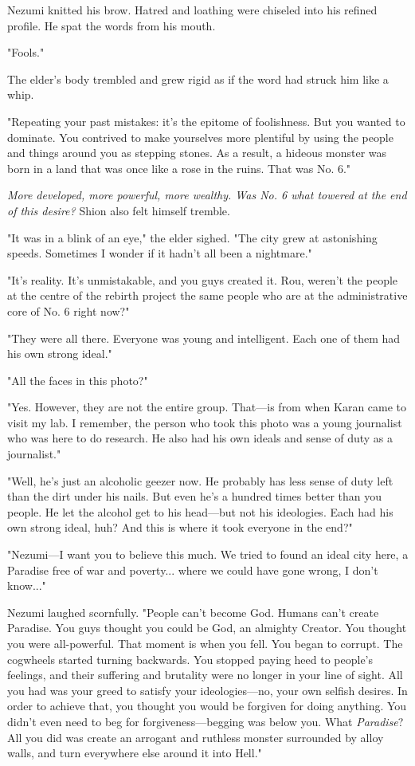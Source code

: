 Nezumi knitted his brow. Hatred and loathing were chiseled into his
refined profile. He spat the words from his mouth.

"Fools."

The elder's body trembled and grew rigid as if the word had struck him
like a whip.

"Repeating your past mistakes: it's the epitome of foolishness. But you
wanted to dominate. You contrived to make yourselves more plentiful by
using the people and things around you as stepping stones. As a result,
a hideous monster was born in a land that was once like a rose in the
ruins. That was No. 6."

\emph{More developed, more powerful, more wealthy. Was No. 6 what towered at
the end of this desire?} Shion also felt himself tremble.

"It was in a blink of an eye," the elder sighed. "The city grew at
astonishing speeds. Sometimes I wonder if it hadn't all been a
nightmare."

"It's reality. It's unmistakable, and you guys created it. Rou, weren't
the people at the centre of the rebirth project the same people who are
at the administrative core of No. 6 right now?"

"They were all there. Everyone was young and intelligent. Each one of
them had his own strong ideal."

"All the faces in this photo?"

"Yes. However, they are not the entire group. That---is from when Karan
came to visit my lab. I remember, the person who took this photo was a
young journalist who was here to do research. He also had his own ideals
and sense of duty as a journalist."

"Well, he's just an alcoholic geezer now. He probably has less sense of
duty left than the dirt under his nails. But even he's a hundred times
better than you people. He let the alcohol get to his head---but not his
ideologies. Each had his own strong ideal, huh? And this is where it
took everyone in the end?"

"Nezumi---I want you to believe this much. We tried to found an ideal city
here, a Paradise free of war and poverty... where we could have gone
wrong, I don't know..."

Nezumi laughed scornfully. "People can't become God. Humans can't create
Paradise. You guys thought you could be God, an almighty Creator. You
thought you were all-powerful. That moment is when you fell. You began
to corrupt. The cogwheels started turning backwards. You stopped paying
heed to people's feelings, and their suffering and brutality were no
longer in your line of sight. All you had was your greed to satisfy your
ideologies---no, your own selfish desires. In order to achieve that, you
thought you would be forgiven for doing anything. You didn't even need
to beg for forgiveness---begging was below you. What \emph{Paradise}? All you did
was create an arrogant and ruthless monster surrounded by alloy walls,
and turn everywhere else around it into Hell."


